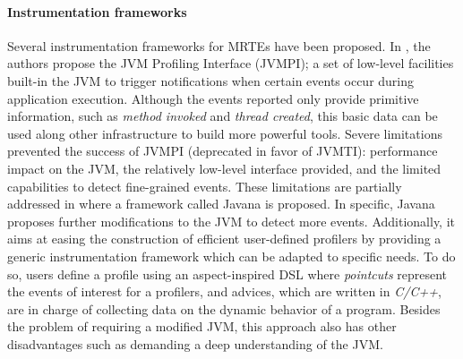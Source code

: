 \paragraph{Instrumentation frameworks}
Several instrumentation frameworks for MRTEs have been proposed.
In \cite{Liang1999}, the authors propose the JVM Profiling Interface (JVMPI); a set of low-level facilities built-in the JVM to trigger notifications when certain events occur during application execution.
Although the events reported only provide primitive information, such as \textit{method invoked} and \textit{thread created}, this basic data can be used along other infrastructure to build more powerful tools.
Severe limitations prevented the success of JVMPI (deprecated in favor of JVMTI): performance impact on the JVM, the relatively low-level interface provided, and the limited capabilities to detect fine-grained events.
These limitations are partially addressed in \cite{Maebe06javana:a} where a framework called Javana is proposed.
In specific, Javana proposes further modifications to the JVM to detect more events.
Additionally, it aims at easing the construction of efficient user-defined profilers by providing a generic instrumentation framework which can be adapted to specific needs.
To do so, users define a profile using an aspect-inspired DSL where \textit{pointcuts} represent the events of interest for a profilers, and advices, which are written in \textit{C/C++}, are in charge of collecting data on the dynamic behavior of a program.
Besides the problem of requiring a modified JVM, this approach also has other disadvantages such as demanding a deep understanding of the JVM.

